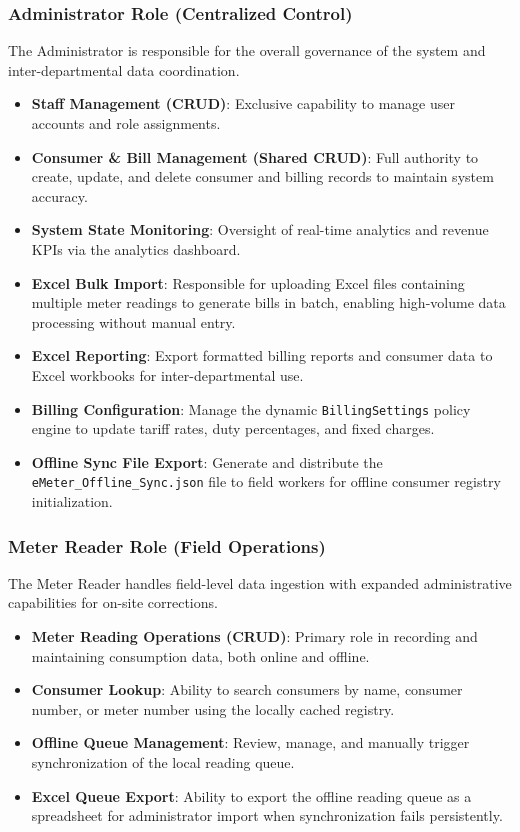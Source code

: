 \documentclass[12pt, a4paper, onecolumn]{report}
\begin{document}
\subsubsection{Administrator Role (Centralized Control)}
The Administrator is responsible for the overall governance of the system and inter-departmental data coordination.
\begin{itemize}
    \item \textbf{Staff Management (CRUD)}: Exclusive capability to manage user accounts and role assignments.
    \item \textbf{Consumer \& Bill Management (Shared CRUD)}: Full authority to create, update, and delete consumer and billing records to maintain system accuracy.
    \item \textbf{System State Monitoring}: Oversight of real-time analytics and revenue KPIs via the analytics dashboard.
    \item \textbf{Excel Bulk Import}: Responsible for uploading Excel files containing multiple meter readings to generate bills in batch, enabling high-volume data processing without manual entry.
    \item \textbf{Excel Reporting}: Export formatted billing reports and consumer data to Excel workbooks for inter-departmental use.
    \item \textbf{Billing Configuration}: Manage the dynamic \texttt{BillingSettings} policy engine to update tariff rates, duty percentages, and fixed charges.
    \item \textbf{Offline Sync File Export}: Generate and distribute the \texttt{eMeter\_Offline\_Sync.json} file to field workers for offline consumer registry initialization.
\end{itemize}

\subsubsection{Meter Reader Role (Field Operations)}
The Meter Reader handles field-level data ingestion with expanded administrative capabilities for on-site corrections.
\begin{itemize}
    \item \textbf{Meter Reading Operations (CRUD)}: Primary role in recording and maintaining consumption data, both online and offline.
    \item \textbf{Consumer Lookup}: Ability to search consumers by name, consumer number, or meter number using the locally cached registry.
    \item \textbf{Offline Queue Management}: Review, manage, and manually trigger synchronization of the local reading queue.
    \item \textbf{Excel Queue Export}: Ability to export the offline reading queue as a spreadsheet for administrator import when synchronization fails persistently.
\end{itemize}
\end{document}
